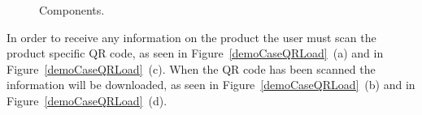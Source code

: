 	\begin{figure}[H]%
		\centering
		\qquad
		\qquad
		\qquad
		\qquad
		\caption{Components.}
		\label{demoCaseRaw}
	\end{figure}
\newpage
In order to receive any information on the product the user must scan the product specific QR code, as seen in Figure~\ref{demoCaseQRLoad}~(a) and in Figure~\ref{demoCaseQRLoad}~(c). When the QR code has been scanned the information will be downloaded, as seen in Figure~\ref{demoCaseQRLoad}~(b) and in Figure~\ref{demoCaseQRLoad}~(d).

